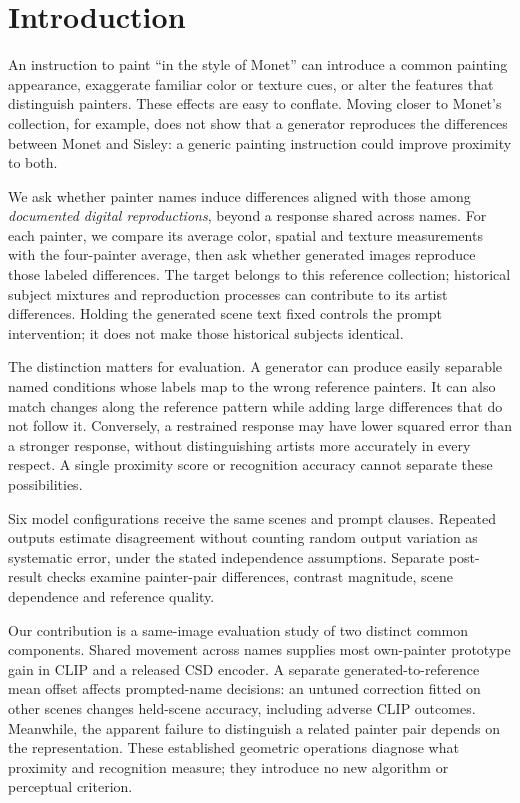 \section{Introduction}
An instruction to paint ``in the style of Monet'' can introduce a common
painting appearance, exaggerate familiar color or texture cues, or alter the
features that distinguish painters. These effects are easy to
conflate. Moving closer to Monet's collection, for example, does not show that
a generator reproduces the differences between Monet and Sisley: a generic
painting instruction could improve proximity to both.

We ask whether painter names induce differences aligned with those among
\emph{documented digital reproductions}, beyond a response shared across names.
For each painter, we compare its average color, spatial and texture measurements
with the four-painter average, then ask whether generated images reproduce
those labeled differences. The target belongs to this reference collection;
historical subject
mixtures and reproduction processes can contribute to its artist differences.
Holding the generated scene text fixed controls the prompt intervention; it
does not make those historical subjects identical.

The distinction matters for evaluation. A generator can produce easily
separable named conditions whose labels map to the wrong reference painters.
It can also match changes along the reference pattern while adding large
differences that do not follow it. Conversely, a restrained response may have lower squared
error than a stronger response, without distinguishing artists more accurately
in every respect. A single proximity score or recognition accuracy cannot
separate these possibilities.

Six model configurations receive the same scenes and prompt clauses.
Repeated outputs estimate
disagreement without counting random output variation as systematic error, under
the stated independence assumptions. Separate post-result checks examine
painter-pair differences, contrast magnitude, scene dependence and reference quality.

Our contribution is a same-image evaluation study of two distinct common
components. Shared movement across names supplies most own-painter prototype
gain in CLIP and a released CSD encoder. A separate generated-to-reference mean
offset affects prompted-name decisions: an untuned correction fitted on other
scenes changes held-scene accuracy, including adverse CLIP outcomes.
Meanwhile, the apparent failure to distinguish a related painter pair depends
on the representation. These established geometric operations diagnose what
proximity and recognition measure; they introduce no new algorithm or
perceptual criterion.


